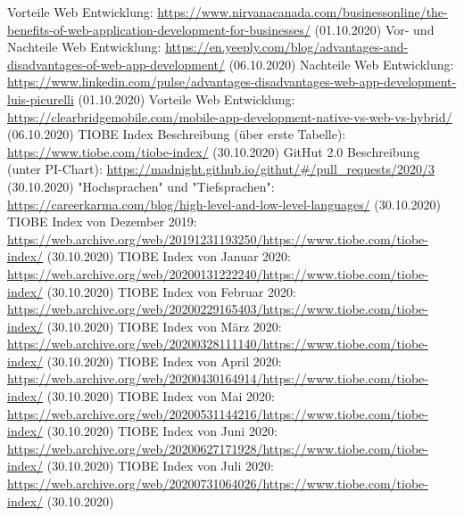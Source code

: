 \documentclass[ngerman]{article}
\begin{document}
\begin{thebibliography}{9}
        Vorteile Web Entwicklung: \url{https://www.nirvanacanada.com/businessonline/the-benefits-of-web-application-development-for-businesses/} (01.10.2020)
        Vor- und Nachteile Web Entwicklung: \url{https://en.yeeply.com/blog/advantages-and-disadvantages-of-web-app-development/} (06.10.2020)
        Nachteile Web Entwicklung: \url{https://www.linkedin.com/pulse/advantages-disadvantages-web-app-development-luis-picurelli} (01.10.2020)
        Vorteile Web Entwicklung: \url{https://clearbridgemobile.com/mobile-app-development-native-vs-web-vs-hybrid/} (06.10.2020)
        TIOBE Index Beschreibung (über erste Tabelle): \url{https://www.tiobe.com/tiobe-index/} (30.10.2020)
        GitHut 2.0 Beschreibung (unter PI-Chart): \url{https://madnight.github.io/githut/#/pull_requests/2020/3} (30.10.2020)
        "Hochsprachen" und "Tiefsprachen": \url{https://careerkarma.com/blog/high-level-and-low-level-languages/} (30.10.2020)
        TIOBE Index von Dezember 2019: \url{https://web.archive.org/web/20191231193250/https://www.tiobe.com/tiobe-index/} (30.10.2020)
        TIOBE Index von Januar 2020: \url{https://web.archive.org/web/20200131222240/https://www.tiobe.com/tiobe-index/} (30.10.2020)
        TIOBE Index von Februar 2020: \url{https://web.archive.org/web/20200229165403/https://www.tiobe.com/tiobe-index/} (30.10.2020)
        TIOBE Index von März 2020: \url{https://web.archive.org/web/20200328111140/https://www.tiobe.com/tiobe-index/} (30.10.2020)
        TIOBE Index von April 2020: \url{https://web.archive.org/web/20200430164914/https://www.tiobe.com/tiobe-index/} (30.10.2020)
        TIOBE Index von Mai 2020: \url{https://web.archive.org/web/20200531144216/https://www.tiobe.com/tiobe-index/} (30.10.2020)
        TIOBE Index von Juni 2020: \url{https://web.archive.org/web/20200627171928/https://www.tiobe.com/tiobe-index/} (30.10.2020)
        TIOBE Index von Juli 2020: \url{https://web.archive.org/web/20200731064026/https://www.tiobe.com/tiobe-index/} (30.10.2020)

\end{thebibliography}
\end{document}
